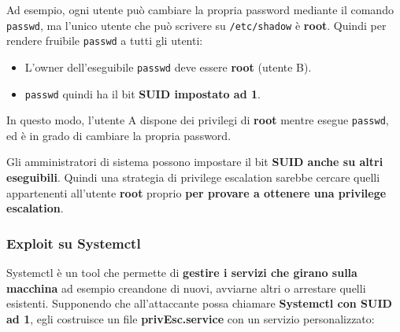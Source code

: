 \documentclass{article}
\begin{document}
Ad esempio, ogni utente può cambiare la propria password mediante il comando \verb|passwd|, ma l’unico utente che può scrivere su \verb|/etc/shadow| è \textbf{root}. Quindi per rendere fruibile \verb|passwd| a tutti gli utenti:
\begin{itemize}
	\item L’owner dell’eseguibile \verb|passwd| deve essere \textbf{root} (utente B).
	\item \verb|passwd| quindi ha il bit \textbf{SUID impostato ad 1}.
\end{itemize}

In questo modo, l'utente A dispone dei privilegi di \textbf{root} mentre esegue \verb|passwd|, ed è in grado di cambiare la propria password.

Gli amministratori di sistema possono impostare il bit \textbf{SUID anche su altri eseguibili}. Quindi una strategia di privilege escalation sarebbe cercare quelli appartenenti all’utente \textbf{root} proprio \textbf{per provare a ottenere una privilege escalation}.

\newpage
\subsubsection{Exploit su Systemctl}
Systemctl è un tool che permette di \textbf{gestire i servizi che girano sulla macchina} ad esempio creandone di nuovi, avviarne altri o arrestare quelli esistenti. Supponendo che all'attaccante possa chiamare \textbf{Systemctl con SUID ad 1}, egli costruisce un file \textbf{privEsc.service} con un servizio personalizzato:
\end{document}
